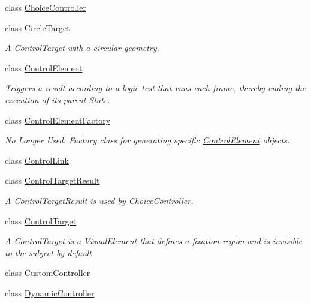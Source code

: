 \begin{DoxyCompactItemize}
class \hyperlink{class_picto_1_1_choice_controller}{Choice\-Controller}
\item 
class \hyperlink{class_picto_1_1_circle_target}{Circle\-Target}
\begin{DoxyCompactList}\small\item\em A \hyperlink{class_picto_1_1_control_target}{Control\-Target} with a circular geometry. \end{DoxyCompactList}\item 
class \hyperlink{class_picto_1_1_control_element}{Control\-Element}
\begin{DoxyCompactList}\small\item\em Triggers a result according to a logic test that runs each frame, thereby ending the execution of its parent \hyperlink{class_picto_1_1_state}{State}. \end{DoxyCompactList}\item 
class \hyperlink{class_picto_1_1_control_element_factory}{Control\-Element\-Factory}
\begin{DoxyCompactList}\small\item\em No Longer Used. Factory class for generating specific \hyperlink{class_picto_1_1_control_element}{Control\-Element} objects. \end{DoxyCompactList}\item 
class \hyperlink{class_picto_1_1_control_link}{Control\-Link}
\item 
class \hyperlink{class_picto_1_1_control_target_result}{Control\-Target\-Result}
\begin{DoxyCompactList}\small\item\em A \hyperlink{class_picto_1_1_control_target_result}{Control\-Target\-Result} is used by \hyperlink{class_picto_1_1_choice_controller}{Choice\-Controller}. \end{DoxyCompactList}\item 
class \hyperlink{class_picto_1_1_control_target}{Control\-Target}
\begin{DoxyCompactList}\small\item\em A \hyperlink{class_picto_1_1_control_target}{Control\-Target} is a \hyperlink{struct_picto_1_1_visual_element}{Visual\-Element} that defines a fixation region and is invisible to the subject by default. \end{DoxyCompactList}\item 
class \hyperlink{class_picto_1_1_custom_controller}{Custom\-Controller}
\item 
class \hyperlink{class_picto_1_1_dynamic_controller}{Dynamic\-Controller}

\end{DoxyCompactItemize}
